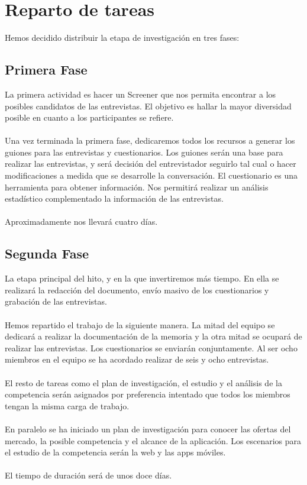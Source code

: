 \documentclass[12pt]{article}
\begin{document}
\section{Reparto de tareas}
Hemos decidido distribuir la etapa de investigación en tres fases:

\subsection{Primera Fase}
La primera actividad es hacer un Screener que nos permita encontrar a los posibles candidatos de las entrevistas. El objetivo es hallar la mayor diversidad posible en cuanto a los participantes se refiere.
\\
\\
	Una vez terminada la primera fase, dedicaremos todos los recursos a generar los guiones para las entrevistas y cuestionarios. Los guiones serán una base para realizar las entrevistas, y será decisión del entrevistador seguirlo tal cual o hacer modificaciones a medida que se desarrolle la conversación. El cuestionario es una herramienta para obtener información. Nos permitirá realizar un análisis estadístico complementado la información de las entrevistas. 
\\
\\
	Aproximadamente nos llevará cuatro días.
\subsection{Segunda Fase}
La etapa principal del hito, y en la que invertiremos más tiempo. En ella se realizará la redacción del documento, envío masivo de los cuestionarios y grabación de las entrevistas.
\\
\\
Hemos repartido el trabajo de la siguiente manera. La mitad del equipo se dedicará a realizar la documentación de la memoria y la otra mitad se ocupará de realizar las entrevistas. Los cuestionarios se enviarán conjuntamente. Al ser ocho miembros en el equipo se ha acordado realizar de seis y ocho entrevistas.
\\
\\
El resto de tareas como el plan de investigación, el estudio y el análisis de la competencia serán asignados por preferencia intentado que todos los miembros tengan la misma carga de trabajo.
\\
\\
En paralelo se ha iniciado un plan de investigación para conocer las ofertas del mercado, la posible competencia y el alcance de la aplicación. Los escenarios para el estudio de la competencia serán la web y las apps móviles.
\\
\\
El tiempo de duración será de unos doce días.
\end{document}
